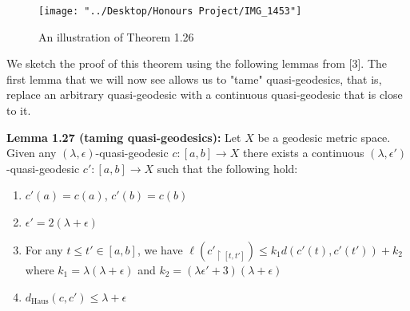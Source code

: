 \documentclass[12pt]{article}
\newcommand{\vs}{\vskip10pt}
\begin{document}
\begin{figure} [H]
	\centering
	\texttt{[image: "../Desktop/Honours Project/IMG\_1453"]}
	\caption{An illustration of Theorem 1.26}
	\label{fig:img1453}
\end{figure}
	
	\vs 
	
	We sketch the proof of this theorem using the following lemmas from [3]. The first lemma that we will now see allows us to "tame" quasi-geodesics, that is, replace an arbitrary quasi-geodesic with a continuous quasi-geodesic that is close to it.
	
	\vs 
	
	\textbf{Lemma 1.27 (taming quasi-geodesics): } Let $X$ be a geodesic metric space. Given any $(\lambda, \epsilon)$-quasi-geodesic $c: [a,b] \rightarrow X$ there exists a continuous $(\lambda, \epsilon')$-quasi-geodesic $c': [a,b] \rightarrow X$ such that the following hold: 
	
	\begin{enumerate}[label = (\roman*)]
		\item $c'(a) = c(a)$, $c'(b) = c(b)$
		\item $\epsilon' = 2(\lambda + \epsilon)$
		\item For any $t \leq t' \in [a,b]$, we have $\ell(c'_{\restriction [t, t']}) \leq k_1 d(c'(t), c'(t')) + k_2$ where $k_1 = \lambda (\lambda + \epsilon)$ and $k_2 = (\lambda \epsilon' + 3)(\lambda + \epsilon)$
		\item  $d_{\text{Haus}}(c, c') \leq \lambda + \epsilon$
	\end{enumerate} 
\end{document}
